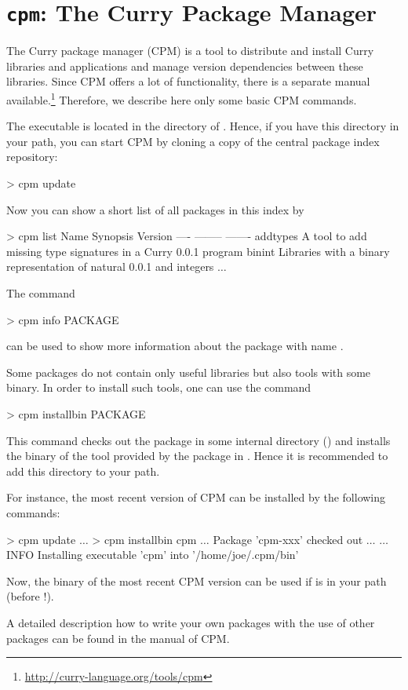 \section{\texttt{cpm}: The Curry Package Manager}
\label{sec-cpm}

The Curry package manager (CPM) is a tool to
distribute and install Curry libraries and applications
and manage version dependencies between these libraries.
Since CPM offers a lot of functionality, there is a separate
manual available.\footnote{\url{http://curry-language.org/tools/cpm}}
Therefore, we describe here only some basic CPM commands.

The executable  is located in the  directory
of \CYS. Hence, if you have this directory in your path,
you can start CPM by cloning a copy of the central package index repository:
%
\begin{curry}
> cpm update
\end{curry}
%
Now you can show a short list of all packages in this index by
%
\begin{curry}
> cpm list
Name             Synopsis                                             Version   
----             --------                                             -------   
addtypes         A tool to add missing type signatures in a Curry     0.0.1     
                 program                                                        
binint           Libraries with a binary representation of natural    0.0.1     
                 and integers                                                   
$\ldots$
\end{curry}
%
The command
%
\begin{curry}
> cpm info PACKAGE
\end{curry}
%
can be used to show more information about the package with name
.

Some packages do not contain only useful libraries
but also tools with some binary. In order to install such tools,
one can use the command
%
\begin{curry}
> cpm installbin PACKAGE
\end{curry}
%
This command checks out the package in some internal directory
()
and installs the binary of the tool provided by the package
in .
Hence it is recommended to add this directory to your path.

For instance, the most recent version of CPM
can be installed by the following commands:
%
\begin{curry}
> cpm update
$\ldots$
> cpm installbin cpm
$\ldots$ Package 'cpm-xxx' checked out $\ldots$
$\ldots$
INFO  Installing executable 'cpm' into '/home/joe/.cpm/bin'
\end{curry}
%
Now, the binary  of the most recent CPM version can be used
if  is in your path
(before !).

A detailed description how to write your own packages
with the use of other packages can be found in the manual of CPM.

